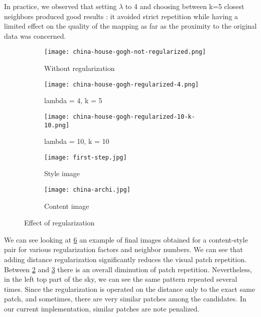 \documentclass[a4paper]{article}
\begin{document}
In practice, we observed that setting $\lambda$ to 4 and choosing between k=5 closest neighbors produced good results : it avoided strict repetition while having a limited effect on the quality of the mapping as far as the proximity to the original data was concerned.



\begin{figure}[!h]
\centering
\begin{subfigure}{.34\textwidth}
  \centering
  \texttt{[image: china-house-gogh-not-regularized.png]}
  \caption{\label{fig:china-house-gogh-not-regularized}Without regularization}
\end{subfigure}
\begin{subfigure}{.32\textwidth}
  \centering
  \texttt{[image: china-house-gogh-regularized-4.png]}
  \caption{\label{fig:china-house-gogh-regularized-4} lambda = 4, k = 5}
\end{subfigure}
\begin{subfigure}{.32\textwidth}
  \centering
  \texttt{[image: china-house-gogh-regularized-10-k-10.png]}
  \caption{\label{fig:china-house-gogh-regularized-10-k-10} lambda = 10, k = 10}
\end{subfigure}
\begin{subfigure}{.32\textwidth}
  \centering
  \texttt{[image: first-step.jpg]}
  \caption{\label{fig:first-step}Style image}
\end{subfigure}
\begin{subfigure}{.32\textwidth}
  \centering
  \texttt{[image: china-archi.jpg]}
  \caption{\label{fig:china-archi}Content image}
\end{subfigure}
\caption{Effect of regularization}
\label{fig:regularization-effect}
\end{figure}

We can see looking at \ref{fig:regularization-effect} an example of final images obtained for a content-style pair for various regularization factors and neighbor numbers. We can see that adding distance regularization significantly reduces the visual patch repetition. Between \ref{fig:china-house-gogh-regularized-4} and \ref{fig:china-house-gogh-regularized-10-k-10}  there is an overall diminution of patch repetition. Nevertheless, in the left top part of the sky, we can see the same pattern repeated several times. Since the regularization is operated on the distance only to the exact same patch, and sometimes, there are very similar patches among the candidates. In our current implementation, similar patches are note penalized.
\end{document}
